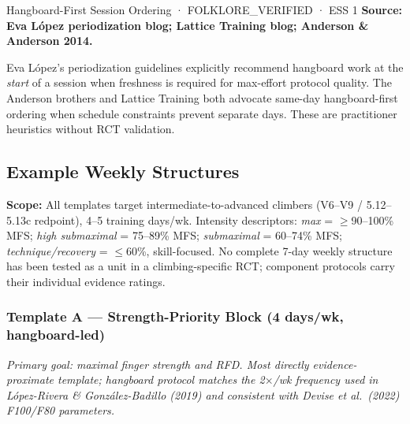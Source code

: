 \begin{folklorebox}{Hangboard-First Session Ordering · FOLKLORE\_VERIFIED · ESS 1}
\textbf{Source: Eva López periodization blog; Lattice Training blog; Anderson \& Anderson 2014.}

Eva López's periodization guidelines explicitly recommend hangboard work at the \emph{start} of a session when freshness is required for max-effort protocol quality. The Anderson brothers and Lattice Training both advocate same-day hangboard-first ordering when schedule constraints prevent separate days. These are practitioner heuristics without RCT validation.
\end{folklorebox}

\subsection{Example Weekly Structures}
\label{subsec:templates}

\noindent\textbf{Scope:} All templates target intermediate-to-advanced climbers (V6–V9 / 5.12–5.13c redpoint), 4–5 training days/wk. Intensity descriptors: \textit{max} = $\geq$90–100\% MFS; \textit{high submaximal} = 75–89\% MFS; \textit{submaximal} = 60–74\% MFS; \textit{technique/recovery} = $\leq$60\%, skill-focused. No complete 7-day weekly structure has been tested as a unit in a climbing-specific RCT; component protocols carry their individual evidence ratings.

\subsubsection*{Template A — Strength-Priority Block (4 days/wk, hangboard-led)}

\noindent\textit{Primary goal: maximal finger strength and RFD. Most directly evidence-proximate template; hangboard protocol matches the 2$\times$/wk frequency used in López-Rivera \& González-Badillo (2019) and consistent with Devise et al.\ (2022) F100/F80 parameters.}

